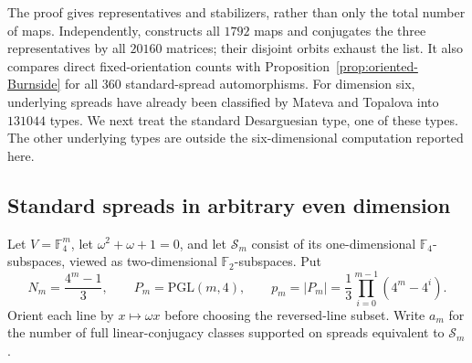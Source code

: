 \documentclass[11pt]{article}
\begin{document}
The proof gives representatives and stabilizers, rather than only the total
number of maps. Independently, 
constructs all $1792$ maps and conjugates the three representatives by all
$20160$ matrices; their disjoint orbits exhaust the list. It also compares
direct fixed-orientation counts with Proposition~\ref{prop:oriented-Burnside}
for all $360$ standard-spread automorphisms.
For dimension six, underlying spreads have already been classified by
Mateva and Topalova \cite{MT09} into $131044$ types. We next treat the
standard Desarguesian type, one of these types. The other underlying types
are outside the six-dimensional computation reported here.


\subsection*{Standard spreads in arbitrary even dimension}
Let $V=\mathbb F_4^m$, let $\omega^2+\omega+1=0$, and let $\mathcal S_m$
consist of its one-dimensional $\mathbb F_4$-subspaces, viewed as
two-dimensional $\mathbb F_2$-subspaces. Put
\[
N_m=\frac{4^m-1}{3},\qquad
P_m=\mathrm{PGL}(m,4),\qquad
p_m=|P_m|=\frac{1}{3}\prod_{i=0}^{m-1}(4^m-4^i).
\]
Orient each line by $x\mapsto\omega x$ before choosing the reversed-line
subset. Write $a_m$ for the number of full linear-conjugacy classes supported
on spreads equivalent to $\mathcal S_m$.
\end{document}
